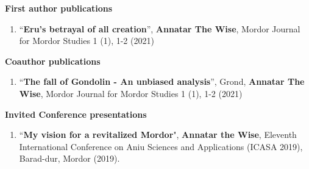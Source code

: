 \clearpage \begin{centering} \textbf{First author publications}\\
\end{centering}

{\singlespacing \begin{enumerate}

\item ``\textbf{Eru's betrayal of all creation}'', \textbf{Annatar The Wise}, Mordor Journal for Mordor Studies 1 (1), 1-2 (2021)

\end{enumerate}}


\begin{centering} \textbf{Coauthor publications}\\ \end{centering}

{\singlespacing \begin{enumerate}


    \item ``\textbf{The fall of Gondolin - An unbiased analysis}'', Grond, \textbf{Annatar The Wise}, Mordor Journal for Mordor Studies 1 (1), 1-2 (2021)

\end{enumerate}}

\begin{centering} \textbf{Invited Conference presentations }\\ \end{centering}


{\singlespacing \begin{enumerate}

\item ``\textbf{My vision for a revitalized Mordor}", \textbf{Annatar the Wise}, Eleventh
International Conference on Aniu Sciences and Applications (ICASA
2019), Barad-dur, Mordor (2019). %

\end{enumerate}}

\clearpage %
